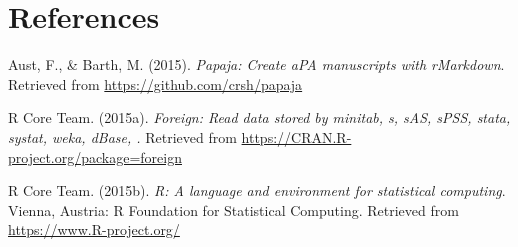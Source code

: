 \documentclass[english,man]{apa6}
\begin{document}
\section{References}\label{references}

\setlength{\parindent}{-0.5in} \setlength{\leftskip}{0.5in}
\setlength{\parskip}{8pt}

Aust, F., \& Barth, M. (2015). \emph{Papaja: Create aPA manuscripts with
rMarkdown}. Retrieved from \url{https://github.com/crsh/papaja}

R Core Team. (2015a). \emph{Foreign: Read data stored by minitab, s,
sAS, sPSS, stata, systat, weka, dBase, .} Retrieved from
\url{https://CRAN.R-project.org/package=foreign}

R Core Team. (2015b). \emph{R: A language and environment for
statistical computing}. Vienna, Austria: R Foundation for Statistical
Computing. Retrieved from \url{https://www.R-project.org/}
\end{document}
